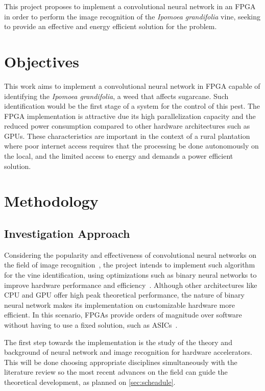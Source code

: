 \documentclass[
	12pt,				%
	oneside,			%
	a4paper,			%
	brazil,			    %
	french,				%
	spanish,			%
	english,			%
	]{abntex2}
\begin{document}
  This project proposes to implement a convolutional neural network in an FPGA in order to perform the image recognition of the \textit{Ipomoea grandifolia} vine, seeking to provide an effective and energy efficient solution for the problem.
  
    
\chapter[Objectives]{Objectives}
 
 This work aims to implement a convolutional neural network in FPGA capable of identifying the \textit{Ipomoea grandifolia}, a weed that affects sugarcane. Such identification would be the first stage of a system for the control of this pest. The FPGA implementation is attractive due its high parallelization capacity and the reduced power consumption compared to other hardware architectures such as GPUs. These characteristics are important in the context of a rural plantation where poor internet access requires that the processing be done  autonomously on the local, and the limited access to energy and demands a power efficient solution.
 
 

\chapter[Methodology]{Methodology}
\section{Investigation Approach}

Considering the popularity and effectiveness of convolutional neural networks on the field of image recognition~\cite{LeCun2015}, the project intends to implement such algorithm for the vine identification, using optimizations such as binary neural networks to improve hardware performance and efficiency~\cite{Nurvitadhi2017_0, Courbariaux2015}. Although other architectures like CPU and GPU offer high peak theoretical performance, the nature of binary neural network makes its implementation on customizable hardware more efficient. In this scenario, FPGAs provide orders of magnitude over software without having to use a fixed solution, such as ASICs~\cite{Courbariaux2015}.

The first step towards the implementation is the study of the theory and background of neural network and image recognition for hardware accelerators. This will be done choosing appropriate disciplines simultaneously with the literature review so the most recent advances on the field can guide the theoretical development, as planned on \autoref{sec:scheadule}.
\end{document}
